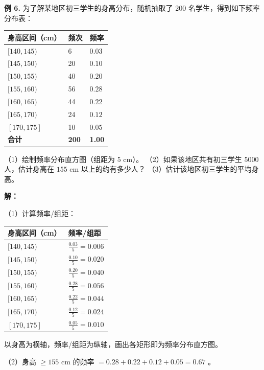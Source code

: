 \begin{workedexamples}


\textbf{例 6.} 为了解某地区初三学生的身高分布，随机抽取了 $200$ 名学生，得到如下频率分布表：

\begin{center}
\begin{tabular}{lll}
\toprule
身高区间（cm） & 频次 & 频率 \\
\midrule
$[140, 145)$ & 6 & $0.03$ \\
$[145, 150)$ & 20 & $0.10$ \\
$[150, 155)$ & 40 & $0.20$ \\
$[155, 160)$ & 56 & $0.28$ \\
$[160, 165)$ & 44 & $0.22$ \\
$[165, 170)$ & 24 & $0.12$ \\
$[170, 175]$ & 10 & $0.05$ \\
\textbf{合计} & \textbf{200} & \textbf{1.00} \\
\bottomrule
\end{tabular}
\end{center}


（1）绘制频率分布直方图（组距为 $5$ cm）。
（2）如果该地区共有初三学生 $5000$ 人，估计身高在 $155$ cm 以上的约有多少人？
（3）估计该地区初三学生的平均身高。

\textbf{解：}

（1）计算频率/组距：

\begin{center}
\begin{tabular}{ll}
\toprule
身高区间（cm） & 频率/组距 \\
\midrule
$[140, 145)$ & $\frac{0.03}{5} = 0.006$ \\
$[145, 150)$ & $\frac{0.10}{5} = 0.020$ \\
$[150, 155)$ & $\frac{0.20}{5} = 0.040$ \\
$[155, 160)$ & $\frac{0.28}{5} = 0.056$ \\
$[160, 165)$ & $\frac{0.22}{5} = 0.044$ \\
$[165, 170)$ & $\frac{0.12}{5} = 0.024$ \\
$[170, 175]$ & $\frac{0.05}{5} = 0.010$ \\
\bottomrule
\end{tabular}
\end{center}


以身高为横轴，频率/组距为纵轴，画出各矩形即为频率分布直方图。

（2）身高 $\geq 155$ cm 的频率 $= 0.28 + 0.22 + 0.12 + 0.05 = 0.67$ 。


\end{workedexamples}
